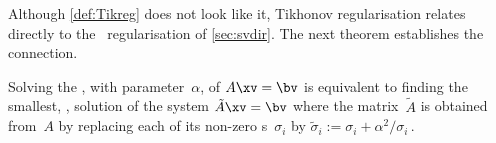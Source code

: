 Although \autoref{def:Tikreg} does not look like it, Tikhonov regularisation relates directly to the \svd\ regularisation of \autoref{sec:svdir}.
The next theorem establishes the connection.



\begin{theorem} \label{thm:Tikreg}
Solving the , with parameter~\(\alpha\), of \(A\xv=\bv\) is equivalent to finding the smallest, , solution of the system \(\tilde A\xv=\bv\) where  
the matrix~\(\tilde A\) is obtained from~\(A\) by replacing each of its non-zero s~\(\sigma_i\) by \(\tilde\sigma_i:=\sigma_i+\alpha^2/\sigma_i\)\,.
\end{theorem}

